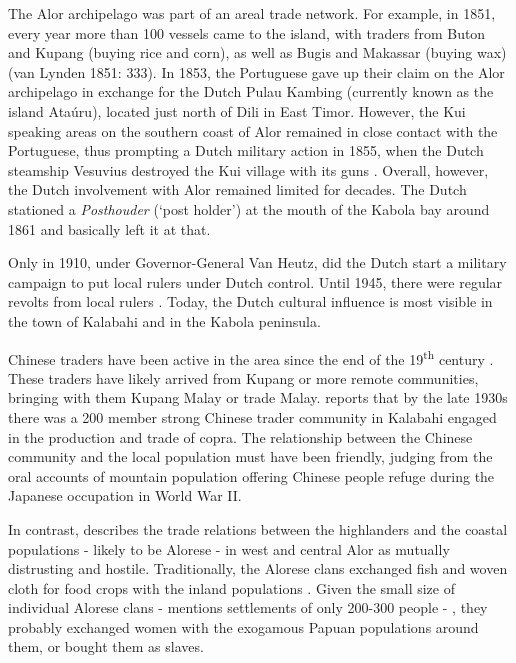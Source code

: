 The Alor archipelago was part of an areal trade network. For example, in 1851, every year more than 100 vessels came to the island, with traders from Buton and Kupang (buying rice and corn), as well as Bugis and Makassar (buying wax) (van Lynden 1851: 333). In 1853, the Portuguese gave up their claim on the Alor archipelago in exchange for the Dutch Pulau Kambing (currently known as the island Ata\'uru), located just north of Dili in East Timor. However, the Kui speaking areas on the southern coast of Alor remained in close contact with the Portuguese, thus prompting a Dutch military action in 1855, when the Dutch steamship Vesuvius destroyed the Kui village with its guns \citep[18019]{Hagerdal2010b}. Overall, however, the Dutch involvement with Alor remained limited for decades. The Dutch stationed a \textit{Posthouder} (`post holder') at the mouth of the Kabola bay around 1861 and basically left it at that.

Only in 1910, under Governor-General Van Heutz, did the Dutch start a military campaign to put local rulers under Dutch control. Until 1945, there were regular revolts from local rulers \citep[see the reports in][2-9]{VanGaalen1945}. Today, the Dutch cultural influence is most visible in the town of Kalabahi and in the Kabola peninsula.

Chinese traders have been active in the area since the end of the 19\textsuperscript{th} century \citep[16]{DuBois1960}. These traders have likely arrived from Kupang or more remote communities, bringing with them Kupang Malay or trade Malay. \citet[1]{Nicolspeyer1940} reports that by the late 1930s there was a 200 member strong Chinese trader community in Kalabahi engaged in the production and trade of copra. The relationship between the Chinese community and the local population must have been friendly, judging from the oral accounts of mountain population offering Chinese people refuge during the Japanese occupation in World War II.

In contrast, \citet[8]{Nicolspeyer1940} describes the trade relations between the highlanders and the coastal populations - likely to be Alorese - in west and central Alor as mutually distrusting and hostile. Traditionally, the Alorese clans exchanged fish and woven cloth for food crops with the inland populations \citep[cf.][76,81-82]{Anonymous1914}. Given the small size of individual Alorese clans - \citet[89-90]{Anonymous1914} mentions settlements of only 200-300 people - , they probably exchanged women with the exogamous Papuan populations around them, or bought them as slaves.

